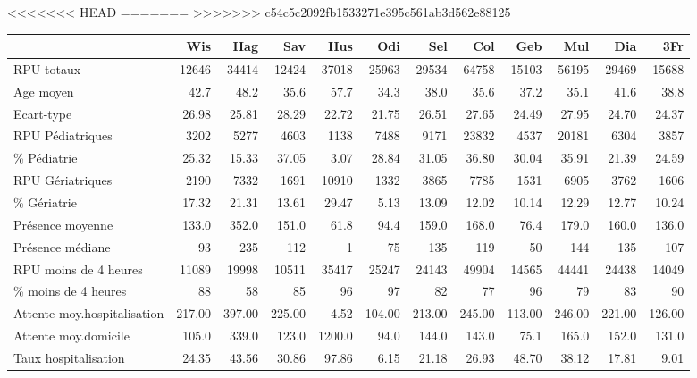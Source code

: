 \documentclass[12pt,english,french,twoside]{book}\usepackage[]{graphicx}\usepackage[]{color}
\begin{document}
\begin{landscape}
<<<<<<< HEAD
=======
>>>>>>> c54c5c2092fb1533271e395c561ab3d562e88125
\begin{table}[ht]
\centering
\begin{tabular}{lrrrrrrrrrrr}
  \hline
 & Wis & Hag & Sav & Hus & Odi & Sel & Col & Geb & Mul & Dia & 3Fr \\ 
  \hline
RPU totaux & 12646 & 34414 & 12424 & 37018 & 25963 & 29534 & 64758 & 15103 & 56195 & 29469 & 15688 \\ 
  Age moyen & 42.7 & 48.2 & 35.6 & 57.7 & 34.3 & 38.0 & 35.6 & 37.2 & 35.1 & 41.6 & 38.8 \\ 
  Ecart-type & 26.98 & 25.81 & 28.29 & 22.72 & 21.75 & 26.51 & 27.65 & 24.49 & 27.95 & 24.70 & 24.37 \\ 
  RPU Pédiatriques &  3202 &  5277 &  4603 &  1138 &  7488 &  9171 & 23832 &  4537 & 20181 &  6304 &  3857 \\ 
  \% Pédiatrie & 25.32 & 15.33 & 37.05 &  3.07 & 28.84 & 31.05 & 36.80 & 30.04 & 35.91 & 21.39 & 24.59 \\ 
  RPU Gériatriques &  2190 &  7332 &  1691 & 10910 &  1332 &  3865 &  7785 &  1531 &  6905 &  3762 &  1606 \\ 
  \% Gériatrie & 17.32 & 21.31 & 13.61 & 29.47 &  5.13 & 13.09 & 12.02 & 10.14 & 12.29 & 12.77 & 10.24 \\ 
  Présence moyenne & 133.0 & 352.0 & 151.0 &  61.8 &  94.4 & 159.0 & 168.0 &  76.4 & 179.0 & 160.0 & 136.0 \\ 
  Présence médiane &  93 & 235 & 112 &   1 &  75 & 135 & 119 &  50 & 144 & 135 & 107 \\ 
  RPU moins de 4 heures & 11089 & 19998 & 10511 & 35417 & 25247 & 24143 & 49904 & 14565 & 44441 & 24438 & 14049 \\ 
  \% moins de 4 heures & 88 & 58 & 85 & 96 & 97 & 82 & 77 & 96 & 79 & 83 & 90 \\ 
  Attente moy.hospitalisation & 217.00 & 397.00 & 225.00 &   4.52 & 104.00 & 213.00 & 245.00 & 113.00 & 246.00 & 221.00 & 126.00 \\ 
  Attente moy.domicile &  105.0 &  339.0 &  123.0 & 1200.0 &   94.0 &  144.0 &  143.0 &   75.1 &  165.0 &  152.0 &  131.0 \\ 
  Taux hospitalisation & 24.35 & 43.56 & 30.86 & 97.86 &  6.15 & 21.18 & 26.93 & 48.70 & 38.12 & 17.81 &  9.01 \\ 

\end{tabular}
\end{table}
\end{landscape}
\end{document}
